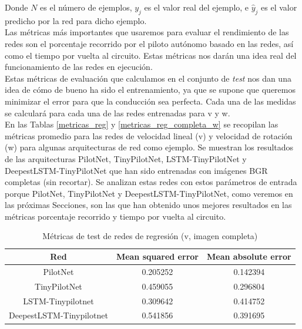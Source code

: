 Donde \(N\) es el número de ejemplos, \(y_j\) es el valor real del ejemplo, e \(\hat{y}_j\) es el valor predicho por la red para dicho ejemplo.\\

Las métricas más importantes que usaremos para evaluar el rendimiento de las redes son el porcentaje recorrido por el piloto autónomo basado en las redes, así como el tiempo por vuelta al circuito. Estas métricas nos darán una idea real del funcionamiento de las redes en ejecución.\\

Estas métricas de evaluación que calculamos en el conjunto de \textit{test} nos dan una idea de cómo de bueno ha sido el entrenamiento, ya que se supone que queremos minimizar el error para que la conducción sea perfecta. Cada una de las medidas se calculará para cada una de las redes entrenadas para v y w.\\


En las Tablas \ref{metricas_reg} y \ref{metricas_reg_completa_w} se recopilan las métricas promedio para las redes de velocidad lineal (v) y velocidad de rotación (w) para algunas arquitecturas de red como ejemplo. Se muestran los resultados de las arquitecturas PilotNet, TinyPilotNet, LSTM-TinyPilotNet y DeepestLSTM-TinyPilotNet que han sido entrenadas con imágenes BGR completas (sin recortar). Se analizan estas redes con estos parámetros de entrada porque PilotNet, TinyPilotNet y DeepestLSTM-TinyPilotNet, como veremos en las próximas Secciones, son las que han obtenido unos mejores resultados en las métricas porcentaje recorrido y tiempo por vuelta al circuito. \\

\begin{table}[H]
\centering
\caption{Métricas de test de redes de regresión (v, imagen completa)}
\label{metricas_reg_completa_v}
\begin{tabular}{c|c|c|}
\cline{1-3}
                        \multicolumn{1}{|c|}{Red}    & Mean squared error       & Mean absolute error             \\ \hline
\multicolumn{1}{|c|}{PilotNet}    & 0.205252    & 0.142394    \\ \hline
\multicolumn{1}{|c|}{TinyPilotNet}     & 0.459055      & 0.296804   \\ \hline
\multicolumn{1}{|c|}{LSTM-Tinypilotnet}     & 0.309642    & 0.414752        \\ \hline
\multicolumn{1}{|c|}{DeepestLSTM-Tinypilotnet}     & 0.541856   & 0.391695    \\ \hline
\end{tabular}
\end{table}


